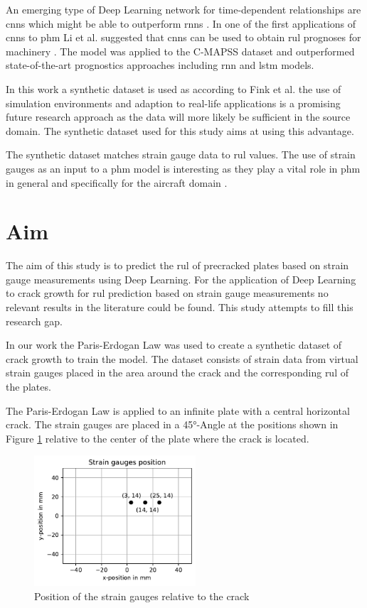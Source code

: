 \documentclass[conference]{IEEEtran}
\begin{document}
An emerging type of Deep Learning network for time-dependent relationships are \glspl{cnn} which might be able to outperform \glspl{rnn} \cite{Bai2018}. In one of the first applications of \glspl{cnn} to \gls{phm} Li et al. suggested that \glspl{cnn} can be used to obtain \gls{rul} prognoses for machinery \cite{Li2018}. The model was applied to the C-MAPSS dataset \cite{Saxena2008} and outperformed state-of-the-art prognostics approaches including \gls{rnn} and \gls{lstm} models.

In this work a synthetic dataset is used as according to Fink et al. \cite{Fink2020} the use of simulation environments and adaption to real-life applications is a promising future research approach as the data will more likely be sufficient in the source domain. The synthetic dataset used for this study aims at using this advantage.

The synthetic dataset matches strain gauge data to \gls{rul} values. The use of strain gauges as an input to a \gls{phm} model is interesting as they play a vital role in \gls{phm} in general \cite{Tinga2019} and specifically for the aircraft domain \cite{Timothy2009}.

\section{Aim}
\label{sec:aim}

The aim of this study is to predict the \gls{rul} of precracked plates based on strain gauge measurements using Deep Learning. 
For the application of Deep Learning to crack growth for \gls{rul} prediction based on strain gauge measurements no relevant results in the literature could be found. This study attempts to fill this research gap.

In our work the Paris-Erdogan Law \cite{Paris1963} was used to create a synthetic dataset of crack growth to train the model. The dataset consists of strain data from virtual strain gauges placed in the area around the crack and the corresponding \gls{rul} of the plates.

The Paris-Erdogan Law is applied to an infinite plate with a central horizontal crack. The strain gauges are placed in a 45°-Angle at the positions shown in Figure \ref{fig:strain_gauge_positions} relative to the center of the plate where the crack is located.

\begin{figure}[htp]
	\centering
	\includegraphics[width=6cm]{python/strain_gauges_position.pdf}
	\caption{Position of the strain gauges relative to the crack}
	\label{fig:strain_gauge_positions}
\end{figure}
\end{document}
